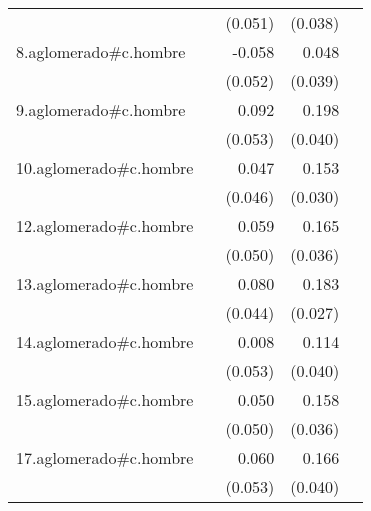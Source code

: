 {\begin{longtable}{l*{4}{D{.}{.}{-1}}}
            &                     &     (0.051)         &     (0.038)         &                     \\
\addlinespace
8.aglomerado#c.hombre&                     &      -0.058         &       0.048         &                     \\
            &                     &     (0.052)         &     (0.039)         &                     \\
\addlinespace
9.aglomerado#c.hombre&                     &       0.092         &       0.198\sym{***}&                     \\
            &                     &     (0.053)         &     (0.040)         &                     \\
\addlinespace
10.aglomerado#c.hombre&                     &       0.047         &       0.153\sym{***}&                     \\
            &                     &     (0.046)         &     (0.030)         &                     \\
\addlinespace
12.aglomerado#c.hombre&                     &       0.059         &       0.165\sym{***}&                     \\
            &                     &     (0.050)         &     (0.036)         &                     \\
\addlinespace
13.aglomerado#c.hombre&                     &       0.080         &       0.183\sym{***}&                     \\
            &                     &     (0.044)         &     (0.027)         &                     \\
\addlinespace
14.aglomerado#c.hombre&                     &       0.008         &       0.114\sym{**} &                     \\
            &                     &     (0.053)         &     (0.040)         &                     \\
\addlinespace
15.aglomerado#c.hombre&                     &       0.050         &       0.158\sym{***}&                     \\
            &                     &     (0.050)         &     (0.036)         &                     \\
\addlinespace
17.aglomerado#c.hombre&                     &       0.060         &       0.166\sym{***}&                     \\
            &                     &     (0.053)         &     (0.040)         &                     \\

\end{longtable}}
